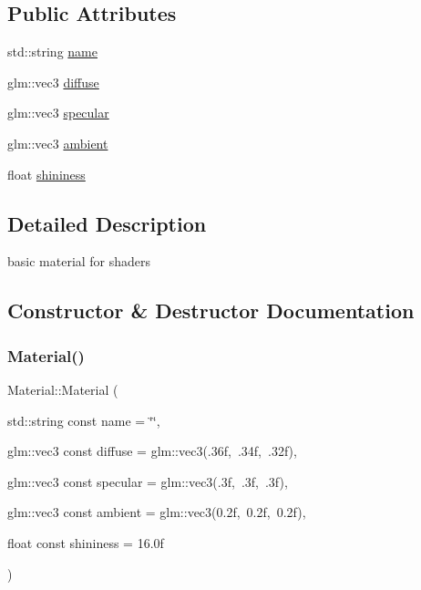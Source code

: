 \subsection*{Public Attributes}
\begin{DoxyCompactItemize}
\item 
std\+::string \hyperlink{class_material_affe06990f884293d0fe2f39110f71730}{name}
\item 
glm\+::vec3 \hyperlink{class_material_a099904e2f5a7bbec3cba6bf8ec546b11}{diffuse}
\item 
glm\+::vec3 \hyperlink{class_material_aac1c499923ff99564cdd97a4b5e504a9}{specular}
\item 
glm\+::vec3 \hyperlink{class_material_af99c823542e497c98a35d1aac5fc9012}{ambient}
\item 
float \hyperlink{class_material_a9dc184c883ec135ace28c1917af3fe84}{shininess}
\end{DoxyCompactItemize}


\subsection{Detailed Description}
basic material for shaders 

\subsection{Constructor \& Destructor Documentation}
\mbox{\label{class_material_a49691a0a92cc3e571869f2b494f8cd5d}} 
\subsubsection{\texorpdfstring{Material()}{Material()}\hspace{0.1cm}{\footnotesize\ttfamily [1/2]}}
{\footnotesize\ttfamily Material\+::\+Material (\begin{DoxyParamCaption}\item[{std\+::string const}]{name = {\ttfamily \char`\"{}\char`\"{}},  }\item[{glm\+::vec3 const}]{diffuse = {\ttfamily glm\+:\+:vec3(.36f,~.34f,~.32f)},  }\item[{glm\+::vec3 const}]{specular = {\ttfamily glm\+:\+:vec3(.3f,~.3f,~.3f)},  }\item[{glm\+::vec3 const}]{ambient = {\ttfamily glm\+:\+:vec3(0.2f,~0.2f,~0.2f)},  }\item[{float const}]{shininess = {\ttfamily 16.0f} }\end{DoxyParamCaption})}



